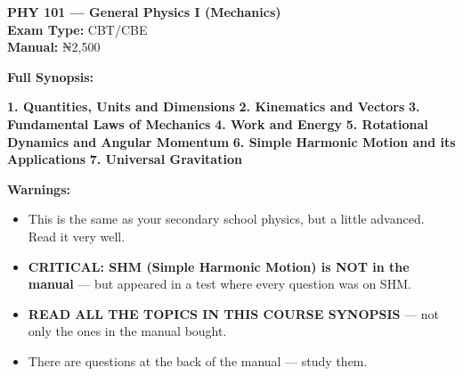 \documentclass[11pt,a4paper]{article}
\begin{document}
\begin{coursebox}
    \textbf{\color{primary}\Large PHY 101 --- General Physics I (Mechanics)}\\[0.3em]
    \textbf{Exam Type:} CBT/CBE \\
    \textbf{Manual:} ₦2,500

    \vspace{0.8em}

    \textbf{Full Synopsis:}

    \textbf{1. Quantities, Units and Dimensions} 
    \textbf{2. Kinematics and Vectors} 
    \textbf{3. Fundamental Laws of Mechanics} 
    \textbf{4. Work and Energy} 
    \textbf{5. Rotational Dynamics and Angular Momentum} 
    \textbf{6. Simple Harmonic Motion and its Applications}
    \textbf{7. Universal Gravitation}  \vspace{0.8em}

    \textbf{\color{warningText}Warnings:}
    \begin{itemize}[leftmargin=1.5em, itemsep=0.2em]
        \item This is the same as your secondary school physics, but a little advanced. Read it very well.
        \item \textbf{CRITICAL: SHM (Simple Harmonic Motion) is NOT in the manual} --- but appeared in a test where every question was on SHM.
        \item \textbf{READ ALL THE TOPICS IN THIS COURSE SYNOPSIS} --- not only the ones in the manual bought.
        \item There are questions at the back of the manual --- study them.
    \end{itemize}
\end{coursebox}
\end{document}

